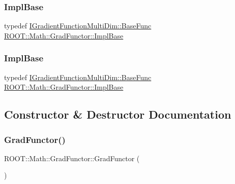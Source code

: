 \subsubsection{\texorpdfstring{ImplBase}{ImplBase}\hspace{0.1cm}{\footnotesize\ttfamily [2/3]}}
{\footnotesize\ttfamily typedef \mbox{\hyperlink{classROOT_1_1Math_1_1IGradientFunctionMultiDim_a803074495bafb5acf9f130b648001609}{I\+Gradient\+Function\+Multi\+Dim\+::\+Base\+Func}} \mbox{\hyperlink{classROOT_1_1Math_1_1GradFunctor_a1fb9161fc93c7e7fa185dddbcc2c4f4d}{R\+O\+O\+T\+::\+Math\+::\+Grad\+Functor\+::\+Impl\+Base}}}

\mbox{\label{classROOT_1_1Math_1_1GradFunctor_a1fb9161fc93c7e7fa185dddbcc2c4f4d}} 
\subsubsection{\texorpdfstring{ImplBase}{ImplBase}\hspace{0.1cm}{\footnotesize\ttfamily [3/3]}}
{\footnotesize\ttfamily typedef \mbox{\hyperlink{classROOT_1_1Math_1_1IGradientFunctionMultiDim_a803074495bafb5acf9f130b648001609}{I\+Gradient\+Function\+Multi\+Dim\+::\+Base\+Func}} \mbox{\hyperlink{classROOT_1_1Math_1_1GradFunctor_a1fb9161fc93c7e7fa185dddbcc2c4f4d}{R\+O\+O\+T\+::\+Math\+::\+Grad\+Functor\+::\+Impl\+Base}}}



\subsection{Constructor \& Destructor Documentation}
\mbox{\label{classROOT_1_1Math_1_1GradFunctor_a68c75192981688e292ee84be652a8ec4}} 
\subsubsection{\texorpdfstring{GradFunctor()}{GradFunctor()}\hspace{0.1cm}{\footnotesize\ttfamily [1/15]}}
{\footnotesize\ttfamily R\+O\+O\+T\+::\+Math\+::\+Grad\+Functor\+::\+Grad\+Functor (\begin{DoxyParamCaption}{ }\end{DoxyParamCaption})\hspace{0.3cm}{\ttfamily [inline]}}

